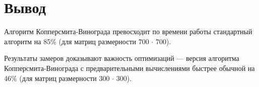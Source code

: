 \clearpage
\section*{Вывод}

Алгоритм Копперсмита-Винограда превосходит по времени работы стандартный алгоритм на 85\% (для матриц размерности 700 $\cdot$ 700). 

Результаты замеров доказывают важность оптимизаций --- версия алгоритма Копперсмита-Винограда с предварительными вычислениями быстрее обычной на 46\% (для матриц размерности 300 $\cdot$ 300).


